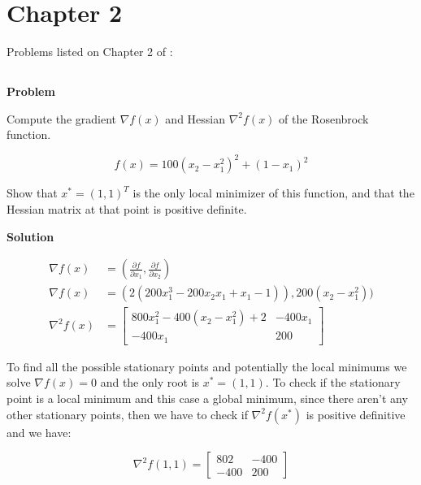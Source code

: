 \documentclass[a4paper,11pt]{article}
\numberwithin{equation}{section} %
\begin{document}
\pagebreak

\section{Chapter 2}

Problems listed on Chapter 2 of \cite{nocedal1999numerical}:

\label{rosenbrock}
\subsection{}

\textbf{Problem}

Compute the gradient $\nabla f(x)$ and Hessian $\nabla^2 f(x)$ of the Rosenbrock function.

\begin{equation}
    f(x) = 100(x_2 -x_1^2)^2 + (1-x_1)^2
\end{equation}

Show that $x^{\ast} = (1, 1)^{T}$ is the only local minimizer of this function, and that the Hessian matrix at that point is positive definite.


\textbf{Solution}

\begin{align}
    \nabla f(x) &= (\frac{\partial f}{\partial x_1}, \frac{\partial f}{\partial x_2}) \\
    \nabla f(x) &= (2(200x_1^3 -200x_2x_1 + x_1- 1)), 200(x_2 - x_1^2)) \\
    \nabla^2 f(x) &=
    \begin{bmatrix}
    800x_1^2 - 400(x_2 - x_1^2) +2 & -400x_1 \\
    -400x_1 & 200
    \end{bmatrix}
\end{align}

To find all the possible stationary points and potentially the local minimums we solve $\nabla f(x) =0$ and the only root is $x^{*} = (1,1)$. To check if the stationary point is a local minimum and this case a global minimum, since there aren't any other stationary points, then we have to check if $\nabla^2 f(x^{*})$ is positive definitive and we have:

\begin{equation}
    \nabla^2 f(1,1) =
    \begin{bmatrix}
        802 & -400 \\
        -400 & 200
    \end{bmatrix}
\end{equation}
\end{document}

